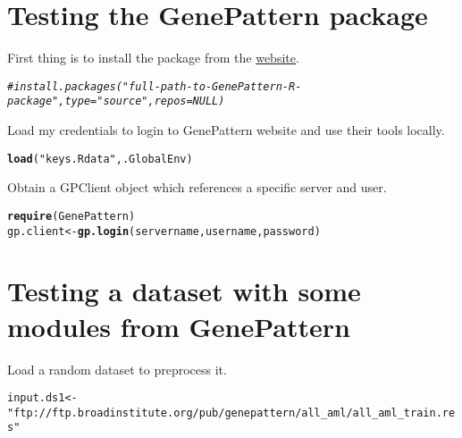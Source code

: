 \documentclass[9pt,english]{extarticle}\usepackage[]{graphicx}\usepackage[]{color}
\makeatletter
\newcommand{\hlstr}[1]{\textcolor[rgb]{0.192,0.494,0.8}{#1}}%
\newcommand{\hlcom}[1]{\textcolor[rgb]{0.678,0.584,0.686}{\textit{#1}}}%
\newcommand{\hlstd}[1]{\textcolor[rgb]{0.345,0.345,0.345}{#1}}%
\newcommand{\hlkwb}[1]{\textcolor[rgb]{0.69,0.353,0.396}{#1}}%
\newcommand{\hlkwd}[1]{\textcolor[rgb]{0.737,0.353,0.396}{\textbf{#1}}}%
\newenvironment{kframe}{%
 \def\at@end@of@kframe{}%
 \ifinner\ifhmode%
  \def\at@end@of@kframe{\end{minipage}}%
  \begin{minipage}{\columnwidth}%
 \fi\fi%
 \def\FrameCommand##1{\hskip\@totalleftmargin \hskip-\fboxsep
 \colorbox{shadecolor}{##1}\hskip-\fboxsep
     \hskip-\linewidth \hskip-\@totalleftmargin \hskip\columnwidth}%
 \MakeFramed {\advance\hsize-\width
   \@totalleftmargin\z@ \linewidth\hsize
   \@setminipage}}%
 {\par\unskip\endMakeFramed%
 \at@end@of@kframe}
\newenvironment{knitrout}{}{} %
\makeatother
\begin{document}
\begin{linenumbers}
\section{Testing the GenePattern package}
\label{sec:testing}
First thing is to install the package from the \href{http://www.broadinstitute.org/cancer/software/genepattern/gp_guides/programmers/sections/gp_r}{website}.
\begin{knitrout}
\color{fgcolor}\begin{kframe}
\begin{alltt}
\hlcom{#install.packages("full-path-to-GenePattern-R-package", type="source", repos=NULL)}
\end{alltt}
\end{kframe}
\end{knitrout}

Load my credentials to login to GenePattern website and use their tools locally.
\begin{knitrout}
\color{fgcolor}\begin{kframe}
\begin{alltt}
\hlkwd{load}\hlstd{(}\hlstr{"keys.Rdata"}\hlstd{, .GlobalEnv)}
\end{alltt}
\end{kframe}
\end{knitrout}

Obtain a GPClient object which references a specific server and user.
\begin{knitrout}
\color{fgcolor}\begin{kframe}
\begin{alltt}
\hlkwd{require}\hlstd{(GenePattern)}
\hlstd{gp.client} \hlkwb{<-} \hlkwd{gp.login}\hlstd{(servername, username, password)}
\end{alltt}
\end{kframe}
\end{knitrout}

\section{Testing a dataset with some modules from GenePattern}
\label{sec:datasets}
Load a random dataset to preprocess it.
\begin{knitrout}
\color{fgcolor}\begin{kframe}
\begin{alltt}
\hlstd{input.ds1} \hlkwb{<-} \hlstr{"ftp://ftp.broadinstitute.org/pub/genepattern/all_aml/all_aml_train.res"}
\end{alltt}
\end{kframe}
\end{knitrout}


\end{linenumbers}
\end{document}
